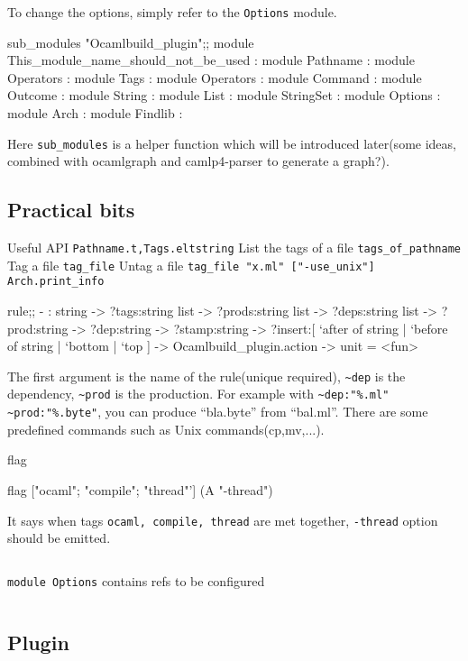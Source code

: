To change the options, simply refer to the \verb|Options| module.

\begin{ocamlcode}
sub_modules "Ocamlbuild_plugin";;
module This_module_name_should_not_be_used :
    module Pathname :
        module Operators :
    module Tags :
        module Operators :
    module Command :
    module Outcome :
    module String :
    module List :
    module StringSet :
    module Options :
    module Arch :
    module Findlib :  
\end{ocamlcode}
Here \verb|sub_modules| is a helper function which will be introduced
later(some ideas, combined with ocamlgraph and camlp4-parser to
generate a graph?).  


\subsection{Practical bits}
Useful API
\verb|Pathname.t,Tags.eltstring|
List the tags of a file \verb|tags_of_pathname|
Tag a file \verb|tag_file|
Untag a file \verb|tag_file "x.ml" ["-use_unix"]|
\verb|Arch.print_info|

\begin{ocamlcode}
rule;;
- : string ->
    ?tags:string list ->
    ?prods:string list ->
    ?deps:string list ->
    ?prod:string ->
    ?dep:string ->
    ?stamp:string ->
    ?insert:[ `after of string | `before of string | `bottom | `top ] ->
    Ocamlbuild_plugin.action -> unit
= <fun>
\end{ocamlcode}
The first argument is the name of the rule(unique required),
\verb|~dep| is the dependency, \verb|~prod| is the production. For
example with \verb|~dep:"%.ml" ~prod:"%.byte"|, you can produce
``bla.byte'' from ``bal.ml''. There are some predefined commands such
as Unix commands(cp,mv,...).

flag
\begin{ocamlcode}
flag ["ocaml"; "compile"; "thread"'] (A "-thread")  
\end{ocamlcode}
It says when tags \verb|ocaml, compile, thread| are met together,
\verb|-thread| option should be emitted.

\inputminted[fontsize=\scriptsize, fontsize=\scriptsize, ]{ocaml}{toolchain/code/command_intf.ml}

\verb|module Options| contains refs to be configured
\inputminted[fontsize=\scriptsize, fontsize=\scriptsize, ]{ocaml}{toochain/code/ocamlbuild/options.mli}

\subsection{Plugin}

